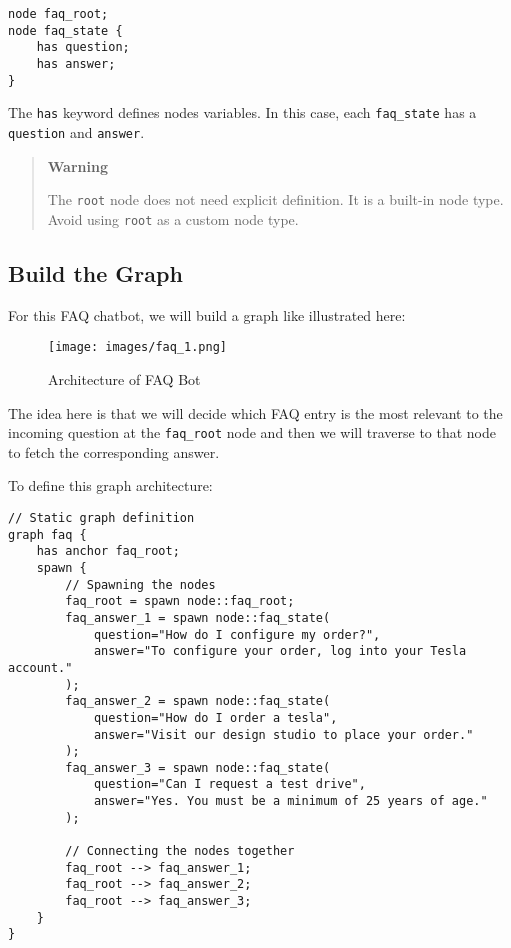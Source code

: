 \begin{lstlisting}
node faq_root;
node faq_state {
    has question;
    has answer;
}
\end{lstlisting}

The \lstinline!has! keyword defines nodes variables. In this case, each
\lstinline!faq_state! has a \lstinline!question! and \lstinline!answer!.

\begin{quote}
\textbf{Warning}

The \lstinline!root! node does not need explicit definition. It is a
built-in node type. Avoid using \lstinline!root! as a custom node type.
\end{quote}

\subsection{Build the Graph}\label{build-the-graph}

For this FAQ chatbot, we will build a graph like illustrated here:

\begin{figure}
\centering
\texttt{[image: images/faq\_1.png]}
\caption{Architecture of FAQ Bot}
\end{figure}

The idea here is that we will decide which FAQ entry is the most
relevant to the incoming question at the \lstinline!faq_root! node and
then we will traverse to that node to fetch the corresponding answer.

To define this graph architecture:

\begin{lstlisting}
// Static graph definition
graph faq {
    has anchor faq_root;
    spawn {
        // Spawning the nodes
        faq_root = spawn node::faq_root;
        faq_answer_1 = spawn node::faq_state(
            question="How do I configure my order?",
            answer="To configure your order, log into your Tesla account."
        );
        faq_answer_2 = spawn node::faq_state(
            question="How do I order a tesla",
            answer="Visit our design studio to place your order."
        );
        faq_answer_3 = spawn node::faq_state(
            question="Can I request a test drive",
            answer="Yes. You must be a minimum of 25 years of age."
        );

        // Connecting the nodes together
        faq_root --> faq_answer_1;
        faq_root --> faq_answer_2;
        faq_root --> faq_answer_3;
    }
}
\end{lstlisting}

